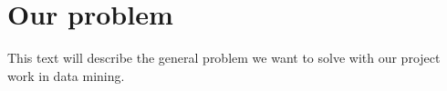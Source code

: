 \section{Our problem}
\label{cha:problem}

This text will describe the general problem we want to solve with our project work in data mining.